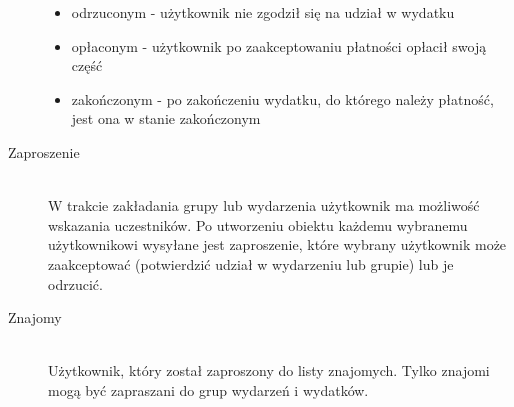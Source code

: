 \begin{description}
\begin{itemize}
    \item odrzuconym - użytkownik nie zgodził się na udział w wydatku
    \item opłaconym - użytkownik po zaakceptowaniu płatności opłacił swoją część
    \item zakończonym - po zakończeniu wydatku, do którego należy płatność, jest ona w stanie zakończonym
  \end{itemize}
\item[Zaproszenie] \hfill \\ W trakcie zakładania grupy lub wydarzenia użytkownik ma możliwość wskazania uczestników. Po utworzeniu obiektu każdemu wybranemu użytkownikowi wysyłane jest zaproszenie, które wybrany użytkownik może zaakceptować (potwierdzić udział w wydarzeniu lub grupie) lub je odrzucić.
\item[Znajomy] \hfill \\ Użytkownik, który został zaproszony do listy znajomych. Tylko znajomi mogą być zapraszani do grup wydarzeń i wydatków.
\end{description}


